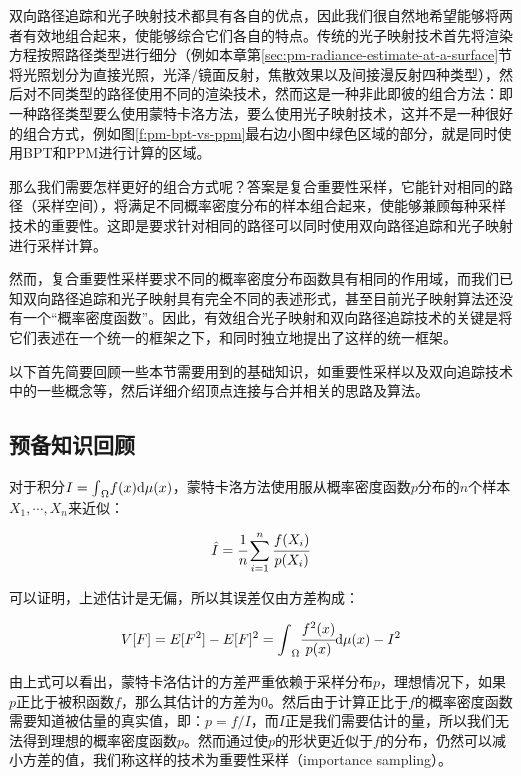 双向路径追踪和光子映射技术都具有各自的优点，因此我们很自然地希望能够将两者有效地组合起来，使能够综合它们各自的特点。传统的光子映射技术首先将渲染方程按照路径类型进行细分（例如本章第\ref{sec:pm-radiance-estimate-at-a-surface}节将光照划分为直接光照，光泽/镜面反射，焦散效果以及间接漫反射四种类型），然后对不同类型的路径使用不同的渲染技术，然而这是一种非此即彼的组合方法：即一种路径类型要么使用蒙特卡洛方法，要么使用光子映射技术，这并不是一种很好的组合方式，例如图\ref{f:pm-bpt-vs-ppm}最右边小图中绿色区域的部分，就是同时使用BPT和PPM进行计算的区域。

那么我们需要怎样更好的组合方式呢？答案是复合重要性采样，它能针对相同的路径（采样空间），将满足不同概率密度分布的样本组合起来，使能够兼顾每种采样技术的重要性。这即是要求针对相同的路径可以同时使用双向路径追踪和光子映射进行采样计算。

然而，复合重要性采样要求不同的概率密度分布函数具有相同的作用域，而我们已知双向路径追踪和光子映射具有完全不同的表述形式，甚至目前光子映射算法还没有一个“概率密度函数”。因此，有效组合光子映射和双向路径追踪技术的关键是将它们表述在一个统一的框架之下，\cite{a:LightTransportSimulationwithVertexConnectionandMerging}和\cite{a:APathSpaceExtensionforRobustLightTransportSimulation}同时独立地提出了这样的统一框架。

以下首先简要回顾一些本节需要用到的基础知识，如重要性采样以及双向追踪技术中的一些概念等，然后详细介绍顶点连接与合并相关的思路及算法。





\subsection{预备知识回顾}
对于积分$I={\rm \int}_{\Omega}f(x){\rm d}\mu (x)$，蒙特卡洛方法使用服从概率密度函数$p$分布的$n$个样本$X_1,\cdots,X_n$来近似：

\begin{equation}
	\hat{I}= \cfrac{1}{n}\sum^{n}_{i=1} \cfrac{f(X_i)}{p(X_i)}
\end{equation}

可以证明，上述估计是无偏，所以其误差仅由方差构成：

\begin{equation}
	V[F]=E[F^{2}]-E[F]^{2}={\rm \int}_{\Omega} \cfrac{f^{2}(x)}{p(x)}{\rm d}\mu (x)-I^{2}
\end{equation}

由上式可以看出，蒙特卡洛估计的方差严重依赖于采样分布$p$，理想情况下，如果$p$正比于被积函数$f$，那么其估计的方差为0。然后由于计算正比于$f$的概率密度函数需要知道被估量的真实值，即：$p=f/I$，而$I$正是我们需要估计的量，所以我们无法得到理想的概率密度函数$p$。然而通过使$p$的形状更近似于$f$的分布，仍然可以减小方差的值，我们称这样的技术为重要性采样（importance sampling）。

